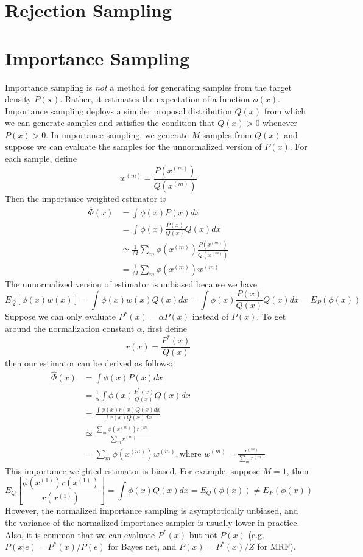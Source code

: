 \documentclass[twoside]{article}
\begin{document}
\section{Rejection Sampling}
\section{Importance Sampling}
Importance sampling is \textit{not} a method for generating samples from the target density $P(\mathbf{x})$. Rather, it estimates the expectation of a function $\phi(x)$. Importance sampling deploys a simpler proposal distribution $Q(x)$ from which we can generate samples and satisfies the condition that $Q(x)>0$ whenever $P(x)>0$. In importance sampling, we generate $M$ samples from $Q(x)$ and suppose we can evaluate the samples for the unnormalized version of $P(x)$. For each sample, define
\[w^{(m)}=\frac{P(x^{(m)})}{Q(x^{(m)})}\]
Then the importance weighted estimator is
\begin{align*}
\hat{\Phi}(x) &=\int \phi(x)P(x)dx\\
&=\int \phi(x)\frac{P(x)}{Q(x)}Q(x)dx\\
&\simeq \frac{1}{M}\sum_m\phi(x^{(m)})\frac{P(x^{(m)})}{Q(x^{(m)})}\\
&=\frac{1}{M}\sum_m\phi(x^{(m)})w^{(m)}
\end{align*}
The unnormalized version of estimator is unbiased because we have
\[E_Q[\phi(x)w(x)]=\int \phi(x)w(x)Q(x)dx=\int \phi(x)\frac{P(x)}{Q(x)}Q(x)dx=E_P(\phi(x))\]
Suppose we can only evaluate $P^*(x)=\alpha P(x)$ instead of $P(x)$. To get around the normalization constant $\alpha$, first define
\[r(x)=\frac{P^*(x)}{Q(x)}\]
then our estimator can be derived as follows:
\begin{align*}
\hat{\Phi}(x) &= \int\phi(x)P(x)dx\\
&=\frac{1}{\alpha}\int \phi(x)\frac{P^*(x)}{Q(x)}Q(x)dx\\
&=\frac{\int \phi(x)r(x)Q(x)dx}{\int r(x)Q(x)dx}\\
&\simeq \frac{\sum_m\phi(x^{(m)})r^{(m)}}{\sum_mr^{(m)}}\\
&=\sum_m\phi(x^{(m)})w^{(m)}, \text{where } w^{(m)}=\frac{r^{(m)}}{\sum_mr^{(m)}}
\end{align*}
This importance weighted estimator is biased. For example, suppose $M=1$, then
\[E_Q[\frac{\phi(x^{(1)})r(x^{(1)})}{r(x^{(1)})}]=\int \phi(x)Q(x)dx=E_Q(\phi(x))\neq E_P(\phi(x))\]
However, the normalized importance sampling is asymptotically unbiased, and the variance of the normalized importance sampler is usually lower in practice. Also, it is common that we can evaluate $P^*(x)$ but not $P(x)$ (e.g. $P(x|e)=P^*(x)/P(e)$ for Bayes net, and $P(x)=P^*(x)/Z$ for MRF).
\end{document}
